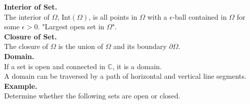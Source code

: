 \documentclass[11pt]{article}
\begin{document}
\newline
\textbf{Interior of Set.} \\
The interior of $\Omega$, Int$(\Omega)$, is all points in $\Omega$ with a $\epsilon$-ball contained in $\Omega$ for some $\epsilon > 0$. "Largest open set in $\Omega$". \\
\newline
\textbf{Closure of Set.} \\ 
The closure of $\Omega$ is the union of $\Omega$ and its boundary $\partial \Omega$. \\
\newline
\textbf{Domain.} \\
If a set is open and connected in $\mathbb{C}$, it is a domain. \\
A domain can be traversed by a path of horizontal and vertical line segments. \\
\newline
\textbf{Example.}\\
Determine whether the following sets are open or closed. 
\end{document}
